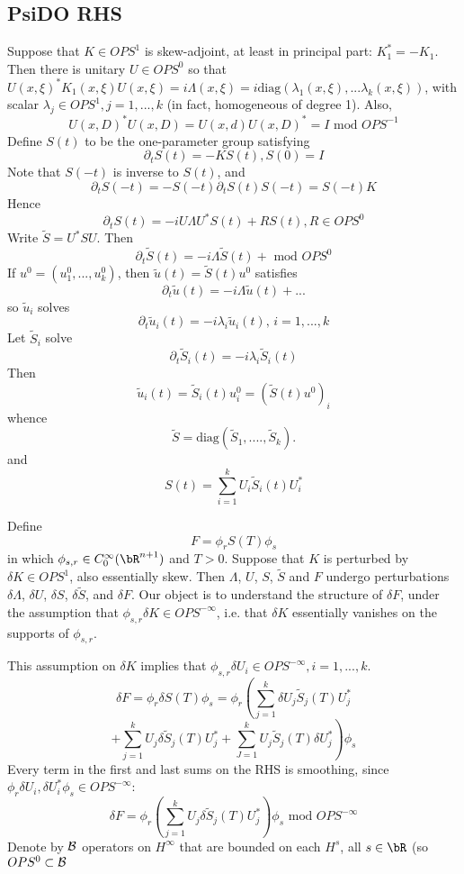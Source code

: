 \subsection{PsiDO RHS}
Suppose that $K \in OPS^1$ is skew-adjoint, at least in principal
part: $K_1^*=-K_1$. Then there is unitary $U \in OPS^0$ so that
$U(x,\xi)^*K_1(x,\xi)U(x,\xi) = i\Lambda(x,\xi) =
i\mbox{diag}(\lambda_1(x,\xi),...\lambda_k(x,\xi))$, with scalar
$\lambda_j \in OPS^1, j=1,...,k$ (in fact, homogeneous of degree
1). Also,
\begin{equation}
  \label{eqn:ortho}
  U(x,D)^*U(x,D) = U(x,d)U(x,D)^* = I \mbox{ mod } OPS^{-1}
\end{equation}
Define $S(t)$ to be the one-parameter group satisfying
\[
  \partial_t S(t) = -K S(t), S(0)=I
\]
Note that $S(-t)$ is inverse to $S(t)$, and 
\[
  \partial_t S(-t) = -S(-t) \partial_t S(t) S(-t) = S(-t)K
\]
Hence
\[
  \partial_t S(t) = -iU \Lambda U^*S(t) + RS(t), R \in OPS^0 
\]
Write $\tilde{S} = U^*SU$. Then 
\[
  \partial_t \tilde{S}(t) = -i\Lambda \tilde{S}(t) + \mbox{ mod } OPS^0 
\]
If $u^0 = (u^0_1,...,u^0_k)$, then $\tilde{u}(t) = \tilde{S}(t)u^0$ satisfies
\[
  \partial_t \tilde{u}(t) = -i\Lambda \tilde{u}(t) + ...
\]
so $\tilde{u}_i$ solves
\[
  \partial_t \tilde{u}_i(t) = -i\lambda_i \tilde{u}_i(t), \, i=1,...,k
\]
Let $\tilde{S}_i$ solve
\begin{equation}
  \label{eqn:stilde}
  \partial_t \tilde{S}_i(t) = - i\lambda_i \tilde{S}_i(t)
\end{equation}
Then
\[
  \tilde{u}_i(t) = \tilde{S}_i(t) u^0_i = (\tilde{S}(t)u^0)_i 
\]
whence
\[
  \tilde{S} = \mbox{diag}(\tilde{S}_1,....,\tilde{S}_k).
\]
and
\begin{equation}
  \label{eqn:spec}
  S(t) = \sum_{i=1}^k U_i \tilde{S}_i(t)U_i^*
\end{equation}

Define
\[
  F = \phi_r S(T) \phi_s
\]
in which $\phi_{s,r} \in C_0^{\infty}(\bR^{n+1})$ and $T>0$. Suppose that $K$
is perturbed by $\delta K \in OPS^1$, also essentially skew. Then
$\Lambda$, $U$, $S$, $\tilde{S}$ and $F$ undergo perturbations
$\delta \Lambda$, $\delta U$, $\delta S$, $\delta \tilde{S}$, and
$\delta F$. Our object is to understand the structure of $\delta F$, under the
assumption that $\phi_{s,r} \delta K \in OPS^{-\infty}$, i.e. that
$\delta K$ essentially vanishes on the supports of $\phi_{s,r}$.

This assumption on $\delta K$ implies that $\phi_{s,r} \delta U_i \in
OPS^{-\infty}, i=1,...,k$. 
\[
  \delta F =  \phi_r \delta S(T) \phi_s  = \phi_r \left(\sum _{j=1}^k \delta U_j \tilde{S}_j(T) U_j^*
\right.
\]
\[
 +  \left. \sum_{j=1}^k U_j \delta\tilde{S}_j(T)U_j^* + \sum_{J=1}^k U_j
    \tilde{S}_j(T)\delta U_j^*\right) \phi_s
\]
Every term in the first and last sums on the RHS is smoothing, since
$\phi_r \delta U_i, \delta U_i^* \phi_s\in OPS^{-\infty}$:
\[
  \delta F = \phi_r \left(\sum_{j=1}^k U_j
    \delta\tilde{S}_j(T)U_j^*\right)\phi_s \mbox{ mod }OPS^{-\infty}
\]
Denote by ${\cal B}$ operators on $H^{\infty}$ that are bounded on
each $H^s$, all $s \in \bR$ (so $OPS^0 \subset {\cal B}$

